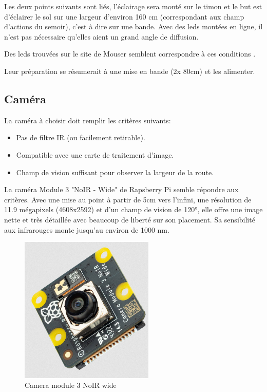 Les deux points suivants sont liés, l'éclairage sera monté sur le timon et le but est d'éclairer le sol sur une largeur d'environ 160 \si{\centi\metre} (correspondant aux champ d'actions du semoir),
c'est à dire sur une bande. Avec des leds montées en ligne, il n'est pas nécessaire qu'elles aient un grand angle de diffusion.

Des leds trouvées sur le site de Mouser semblent correspondre à ces conditions \cite{ledIR}.

Leur préparation se résumerait à une mise en bande (2x 80\si{\centi\metre}) et les alimenter.


\subsection{Caméra}
La caméra à choisir doit remplir les critères suivants:
\begin{itemize}
    \item Pas de filtre IR (ou facilement retirable).
    \item Compatible avec une carte de traitement d'image.
    \item Champ de vision suffisant pour observer la largeur de la route.
\end{itemize}

La caméra Module 3 "NoIR - Wide" de Rapsberry Pi \cite{camera} semble répondre aux critères. Avec une mise au point à partir de 5cm vers l'infini,
une résolution de 11.9 mégapixels (4608x2592) et d'un champ de vision de \ang{120}, elle offre une image nette et très détaillée avec beaucoup de liberté sur
son placement. Sa sensibilité aux infrarouges monte jusqu'au environ de 1000 \si{\nano\metre}.
\begin{figure}[H]
    \centering
    \includegraphics[height=7cm,angle=-90]{assets/figures/camera.png}
    \caption{Camera module 3 NoIR wide}
\end{figure}

